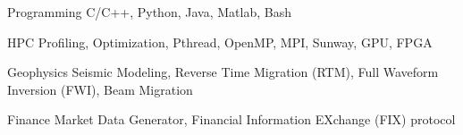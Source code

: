 \documentclass[11pt, a4paper]{awesome-cv}
\begin{document}
\begin{cvskills}
%
  \cvskill
    {Programming} %
    {C/C++, Python, Java, Matlab, Bash} %

  \cvskill
    {HPC} %
    {Profiling, Optimization, Pthread, OpenMP, MPI, Sunway, GPU, FPGA} %

  \cvskill
    {Geophysics} %
    {Seismic Modeling, Reverse Time Migration (RTM), Full Waveform Inversion (FWI), Beam Migration} %
    
  \cvskill
    {Finance} %
    {Market Data Generator, Financial Information EXchange (FIX) protocol} %

\end{cvskills}




\end{document}
